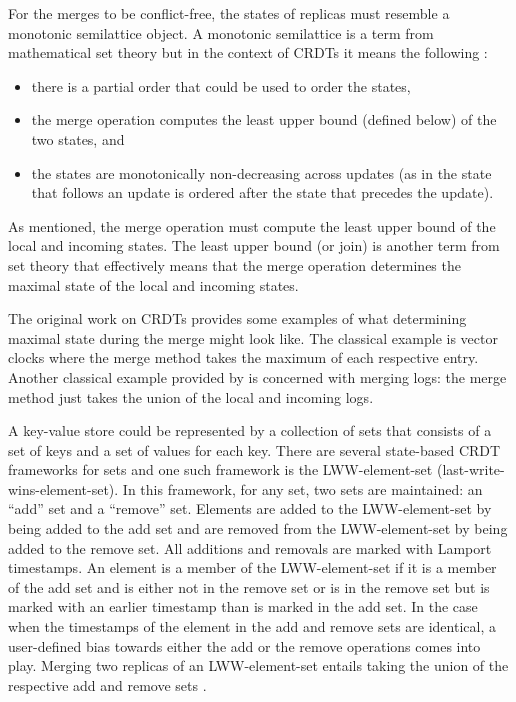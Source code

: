 \documentclass[sigconf,nonacm,10pt]{acmart}
\begin{document}
For the merges to be conflict-free, the states of replicas must resemble a monotonic semilattice object. A monotonic semilattice is a term from mathematical set theory \cite{Davey:Lattices} but in the context of CRDTs it means the following \cite{shapiro2011conflict}:
\begin{itemize}
 \item there is a partial order that could be used to order the states,
 \item the merge operation computes the least upper bound (defined below) of the two states, and
 \item the states are monotonically non-decreasing across updates (as in the state that follows an update is ordered after the state that precedes the update).
\end{itemize}

As mentioned, the merge operation must compute the least upper bound of the local and incoming states. The least upper bound (or join) is another term from set theory \cite{Davey:Lattices} that effectively means that the merge operation determines the maximal state of the local and incoming states.

The original work on CRDTs \cite{shapiro2011conflict} provides some examples of what determining maximal state during the merge might look like. The classical example is vector clocks where the merge method takes the maximum of each respective entry. Another classical example provided by \cite{shapiro2011conflict} is concerned with merging logs: the merge method just takes the union of the local and incoming logs.

A key-value store could be represented by a collection of sets that consists of a set of keys and a set of values for each key. There are several state-based CRDT frameworks for sets and one such framework is the LWW-element-set (last-write-wins-element-set). In this framework, for any set, two sets are maintained: an ``add'' set and a ``remove'' set. Elements are added to the LWW-element-set by being added to the add set and are removed from the LWW-element-set by being added to the remove set. All additions and removals are marked with Lamport timestamps. An element is a member of the LWW-element-set if it is a member of the add set and is either not in the remove set or is in the remove set but is marked with an earlier timestamp than is marked in the add set. In the case when the timestamps of the element in the add and remove sets are identical, a user-defined bias towards either the add or the remove operations comes into play. Merging two replicas of an LWW-element-set entails taking the union of the respective add and remove sets \cite{shapiro2011comprehensive}.
\end{document}
